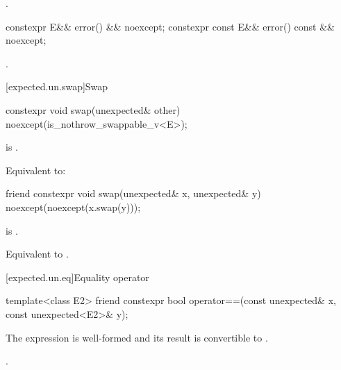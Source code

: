 \begin{itemdescr}
\pnum
\returns
{}.
\end{itemdescr}

%
\begin{itemdecl}
constexpr E&& error() && noexcept;
constexpr const E&& error() const && noexcept;
\end{itemdecl}

\begin{itemdescr}
\pnum
\returns
{}.
\end{itemdescr}

[expected.un.swap]{Swap}

%
\begin{itemdecl}
constexpr void swap(unexpected& other) noexcept(is_nothrow_swappable_v<E>);
\end{itemdecl}

\begin{itemdescr}
\pnum
\mandates
{} is .

\pnum
\effects
Equivalent to:
\end{itemdescr}

\begin{itemdecl}
friend constexpr void swap(unexpected& x, unexpected& y) noexcept(noexcept(x.swap(y)));
\end{itemdecl}

\begin{itemdescr}
\pnum
\constraints
{} is .

\pnum
\effects
Equivalent to .
\end{itemdescr}

[expected.un.eq]{Equality operator}

%
\begin{itemdecl}
template<class E2>
  friend constexpr bool operator==(const unexpected& x, const unexpected<E2>& y);
\end{itemdecl}

\begin{itemdescr}
\pnum
\mandates
The expression  is well-formed and
its result is convertible to .

\pnum
\returns
{}.
\end{itemdescr}

